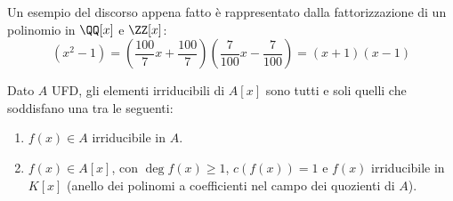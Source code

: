 \documentclass[11pt]{scrartcl}
\begin{document}
\begin{example}
    Un esempio del discorso appena fatto è rappresentato dalla fattorizzazione di un polinomio in $\QQ[x]$ e $\ZZ[x]$:
    \[ (x^2 - 1) = \left(\frac{100}{7}x+\frac{100}{7}\right)\left(\frac{7}{100}x - \frac{7}{100}\right) = (x + 1)(x - 1)
        \]
\end{example}

\begin{theorem}
    Dato $A$ UFD, gli elementi irriducibili di $A[x]$ sono tutti e soli quelli che soddisfano una tra le seguenti:
    \begin{enumerate}[(1)]
        \item $f(x) \in A$ irriducibile in $A$.
        \item $f(x) \in A[x]$, con $\deg f(x) \geq 1$, $c(f(x)) = 1$ e $f(x)$ irriducibile in $K[x]$ (anello dei polinomi a coefficienti nel campo dei quozienti di $A$).
    \end{enumerate}
\end{theorem}
\end{document}

